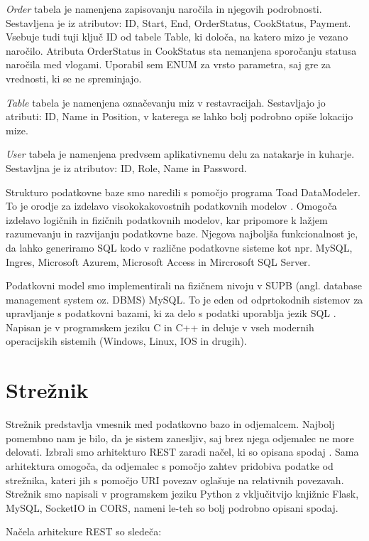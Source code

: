 \documentclass[a4paper, 12pt]{book}
\begin{document}
\textit{Order} tabela je namenjena zapisovanju naročila in njegovih podrobnosti. Sestavljena je iz atributov: ID, Start, End, OrderStatus, CookStatus, Payment. Vsebuje tudi tuji ključ ID od tabele Table, ki določa, na katero mizo je vezano naročilo. Atributa OrderStatus in CookStatus sta nemanjena sporočanju statusa naročila med vlogami. Uporabil sem ENUM za vrsto parametra, saj gre za vrednosti, ki se ne spreminjajo.

\textit{Table} tabela je namenjena označevanju miz v restavracijah. Sestavljajo jo atributi: ID, Name in Position, v katerega se lahko bolj podrobno opiše lokacijo mize.

\textit{User} tabela je namenjena predvsem aplikativnemu delu za natakarje in kuharje. Sestavljna je iz atributov: ID, Role, Name in Password. 

Strukturo podatkovne baze smo naredili s pomočjo programa Toad DataModeler. To je orodje za izdelavo visokokakovostnih podatkovnih modelov \cite{Toad_Data_Modeler}. Omogoča izdelavo logičnih in fizičnih podatkovnih modelov, kar pripomore k lažjem razumevanju in razvijanju podatkovne baze. Njegova najboljša funkcionalnost je, da lahko generiramo SQL kodo v različne podatkovne sisteme kot npr. MySQL, Ingres, Microsoft Azurem, Microsoft Access in Mircrosoft SQL Server.

Podatkovni model smo implementirali na fizičnem nivoju v SUPB  (angl. database management system oz. DBMS) MySQL. To je eden od odprtokodnih sistemov za upravljanje s podatkovni bazami, ki za delo s podatki uporablja jezik SQL \cite{MySQL}. Napisan je v programskem jeziku C in C++ in deluje v vseh modernih operacijskih sistemih (Windows, Linux, IOS in drugih).


\section{Strežnik}
Strežnik predstavlja vmesnik med podatkovno bazo in odjemalcem. Najbolj pomembno nam je bilo, da je sistem zanesljiv, saj brez njega odjemalec ne more delovati. Izbrali smo arhitekturo REST zaradi načel, ki so opisana spodaj \cite{RESTAPI}. Sama arhitektura omogoča, da odjemalec s pomočjo zahtev pridobiva podatke od strežnika, kateri jih s pomočjo URI povezav oglašuje na relativnih povezavah. Strežnik smo napisali v programskem jeziku Python z vključitvijo knjižnic Flask, MySQL, SocketIO in CORS, nameni le-teh so bolj podrobno opisani spodaj.

Načela arhitekure REST so sledeča:
\end{document}
